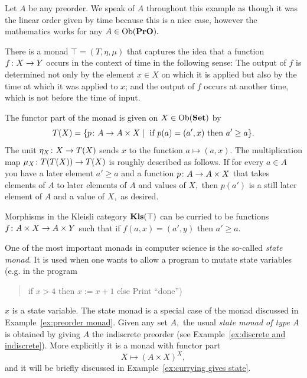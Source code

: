 \documentclass[../main/CT4S-EN-RU]{subfiles}
\begin{document}
\begin{exampleENG}\label{ex:preorder monad}
Let $A$ be any preorder. We speak of $A$ throughout this example as though it was the linear order given by time because this is a nice case, however the mathematics works for any $A\in\operatorname{Ob}({\mathbf{PrO}}).$ 

There is a monad $\top=(T,\eta,\mu)$ that captures the idea that a function $f\colon X\rightarrow Y$ occurs in the context of time in the following sense: The output of $f$ is determined not only by the element $x\in X$ on which it is applied but also by the time at which it was applied to $x$; and the output of $f$ occurs at another time, which is not before the time of input.

The functor part of the monad is given on $X\in\operatorname{Ob}({\mathbf{Set}})$ by
$$T(X)=\{p\colon A\rightarrow A\times X{\;|\;}\textnormal{ if } p(a)=(a',x)\textnormal{ then } a'\geq a\}.$$
The unit $\eta_X\colon X\rightarrow T(X)$ sends $x$ to the function $a\mapsto (a,x).$ The multiplication map $\mu_X\colon T(T(X))\rightarrow T(X)$ is roughly described as follows. If for every $a\in A$ you have a later element $a'\geq a$ and a function $p\colon A\rightarrow A\times X$ that takes elements of $A$ to later elements of $A$ and values of $X,$ then $p(a')$ is a still later element of $A$ and a value of $X,$ as desired.

Morphisms in the Kleisli category ${\mathbf{Kls}}(\top)$ can be curried to be functions $f\colon A\times X\rightarrow A\times Y$ such that if $f(a,x)=(a',y)$ then $a'\geq a.$ 
\end{exampleENG}

\begin{exampleRUS}\label{ex:preorder monad}
\end{exampleRUS}

\begin{remarkENG}\label{rem:state monad}
One of the most important monads in computer science is the so-called {\em state monad}. It is used when one wants to allow a program to mutate state variables (e.g. in the program 
\begin{quote}if $x>4$ then $x:=x+1$ else Print “done”)\end{quote}
$x$ is a state variable. The state monad is a special case of the monad discussed in Example~\ref{ex:preorder monad}. Given any set $A,$ the usual {\em state monad of type $A$} is obtained by giving $A$ the indiscrete preorder (see Example~\ref{ex:discrete and indiscrete}). More explicitly it is a monad with functor part $$X\mapsto (A\times X)^X,$$ and it will be briefly discussed in Example~\ref{ex:currying gives state}.
\end{remarkENG}
\end{document}
